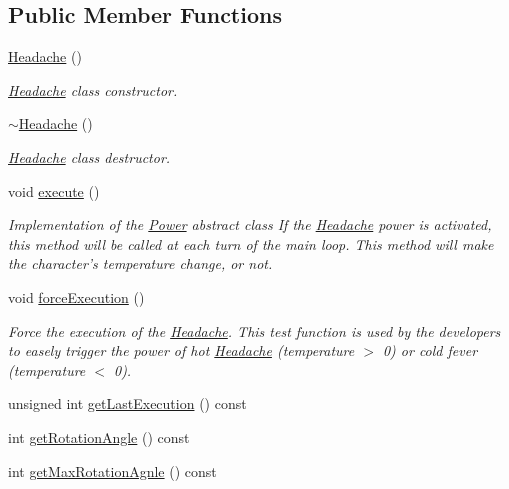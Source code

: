 \subsection*{Public Member Functions}
\begin{DoxyCompactItemize}
\item 
\hyperlink{class_symp_1_1_headache_a26cf6da6951ee941717d37d85c588a88}{Headache} ()
\begin{DoxyCompactList}\small\item\em \hyperlink{class_symp_1_1_headache}{Headache} class constructor. \end{DoxyCompactList}\item 
\hyperlink{class_symp_1_1_headache_ac739f61635fa88fdf1a337d855adb793}{$\sim$\-Headache} ()
\begin{DoxyCompactList}\small\item\em \hyperlink{class_symp_1_1_headache}{Headache} class destructor. \end{DoxyCompactList}\item 
void \hyperlink{class_symp_1_1_headache_a5de12b8de4529142a63e738132292e83}{execute} ()
\begin{DoxyCompactList}\small\item\em Implementation of the \hyperlink{class_symp_1_1_power}{Power} abstract class If the \hyperlink{class_symp_1_1_headache}{Headache} power is activated, this method will be called at each turn of the main loop. This method will make the character's temperature change, or not. \end{DoxyCompactList}\item 
void \hyperlink{class_symp_1_1_headache_adfb5b616e538d1c62062b854cdae464d}{force\-Execution} ()
\begin{DoxyCompactList}\small\item\em Force the execution of the \hyperlink{class_symp_1_1_headache}{Headache}. This test function is used by the developers to easely trigger the power of hot \hyperlink{class_symp_1_1_headache}{Headache} (temperature $>$ 0) or cold fever (temperature $<$ 0). \end{DoxyCompactList}\item 
unsigned int \hyperlink{class_symp_1_1_headache_aa65ea728ce75f6f3bdff9399d2235c4f}{get\-Last\-Execution} () const 
\item 
int \hyperlink{class_symp_1_1_headache_adcb2f0e2cb987f1678efae7f97100533}{get\-Rotation\-Angle} () const 
\item 
int \hyperlink{class_symp_1_1_headache_afb523ed96f5d079260573061da25dfa8}{get\-Max\-Rotation\-Agnle} () const 

\end{DoxyCompactItemize}
